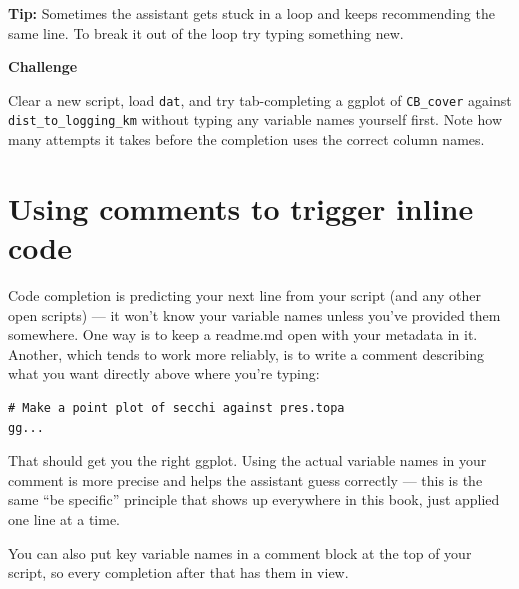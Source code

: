 \documentclass[
  letterpaper,
  DIV=11,
  numbers=noendperiod]{scrreprt}
\begin{document}
\textbf{Tip:} Sometimes the assistant gets stuck in a loop and keeps
recommending the same line. To break it out of the loop try typing
something new.

\begin{tcolorbox}[enhanced jigsaw, toprule=.15mm, rightrule=.15mm, left=2mm, leftrule=.75mm, breakable, opacityback=0, arc=.35mm, colframe=quarto-callout-important-color-frame, bottomrule=.15mm, colback=white]
\begin{minipage}[t]{5.5mm}
\textcolor{quarto-callout-important-color}{\faExclamation}
\end{minipage}%
\begin{minipage}[t]{\textwidth - 5.5mm}

\vspace{-3mm}\textbf{Challenge}\vspace{3mm}

Clear a new script, load \texttt{dat}, and try tab-completing a ggplot
of \texttt{CB\_cover} against \texttt{dist\_to\_logging\_km} without
typing any variable names yourself first. Note how many attempts it
takes before the completion uses the correct column names.

\end{minipage}%
\end{tcolorbox}

\chapter{Using comments to trigger inline
code}\label{using-comments-to-trigger-inline-code}

Code completion is predicting your next line from your script (and any
other open scripts) --- it won't know your variable names unless you've
provided them somewhere. One way is to keep a readme.md open with your
metadata in it. Another, which tends to work more reliably, is to write
a comment describing what you want directly above where you're typing:

\begin{verbatim}
# Make a point plot of secchi against pres.topa
gg...
\end{verbatim}

That should get you the right ggplot. Using the actual variable names in
your comment is more precise and helps the assistant guess correctly ---
this is the same ``be specific'' principle that shows up everywhere in
this book, just applied one line at a time.

You can also put key variable names in a comment block at the top of
your script, so every completion after that has them in view.
\end{document}
